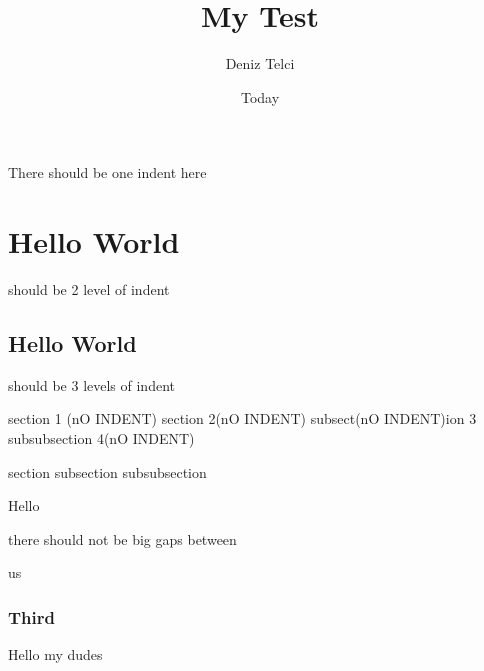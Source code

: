 \documentclass{article}
\title{My Test}
\author{Deniz Telci}
\date{Today}
\begin{document}
There should be one indent here
    \section{Hello World}
    should be 2 level of indent

        \subsection{Hello World}
        should be 3 levels of indent

         section 1 (nO INDENT)
        section 2(nO INDENT)
                     subsect(nO INDENT)ion 3
        subsubsection 4(nO INDENT)

        section
        subsection
        subsubsection


        Hello



        there should not be big gaps between


        us

    \subsubsection{Third}

    \begin{center}
        Hello my dudes
    \end{center}
\end{document}
